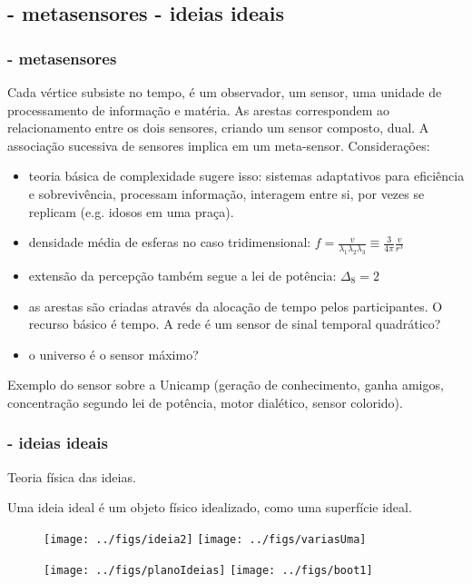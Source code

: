\documentclass[10pt]{beamer}
\begin{document}
\subsection{- metasensores \;\; - ideias ideais}
\begin{frame}
\frametitle{- metasensores}

Cada vértice subsiste no tempo, é um observador, um sensor, uma unidade de processamento de informação e matéria. As arestas correspondem ao relacionamento entre os dois sensores, criando um sensor composto, dual. A associação sucessiva de sensores implica em um meta-sensor. Considerações:

\begin{itemize}
	\item teoria básica de complexidade sugere isso: sistemas adaptativos para eficiência e sobrevivência, processam informação, interagem entre si, por vezes se replicam (e.g. idosos em uma praça).
	\item densidade média de esferas no caso tridimensional: $f=\frac{v}{\lambda_1 \lambda_2 \lambda_3}\equiv \frac{3}{4 \pi} \frac{v}{r^3}$
	\item extensão da percepção também segue a lei de potência: $\Delta_8=2^{}$
	\item as arestas são criadas através da alocação de tempo pelos participantes. O recurso básico é tempo. A rede é um sensor de sinal temporal quadrático?
	\item o universo é o sensor máximo?
\end{itemize}

Exemplo do sensor sobre a Unicamp (geração de conhecimento, ganha amigos, concentração segundo lei de potência, motor dialético, sensor colorido).
\end{frame}

\begin{frame}
\frametitle{- ideias ideais}
Teoria física das ideias.

Uma ideia ideal é um objeto físico idealizado, como uma superfície ideal.

\begin{figure}[!h]
    \texttt{[image: ../figs/ideia2]}
    \hspace{2cm}
    \texttt{[image: ../figs/variasUma]}
\end{figure}
\begin{figure}[!h]
    \texttt{[image: ../figs/planoIdeias]}
    \hspace{2cm}
    \texttt{[image: ../figs/boot1]}
\end{figure}



\end{frame}
\end{document}
